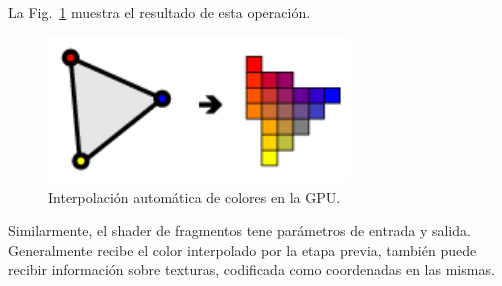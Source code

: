 La Fig.~\ref{fg:interpolation} muestra el resultado de esta operación.

\begin{figure}[h]
\begin{center}
\includegraphics[width=8cm]{figures/interpolation}
\end{center}
\caption{Interpolación automática de colores en la GPU.}
\label{fg:interpolation}
\end{figure}






Similarmente, el shader de fragmentos tene par\'ametros de entrada y salida.
Generalmente recibe el color interpolado por la etapa previa, tambi\'en puede recibir informaci\'on sobre texturas, codificada como coordenadas en las mismas. 



